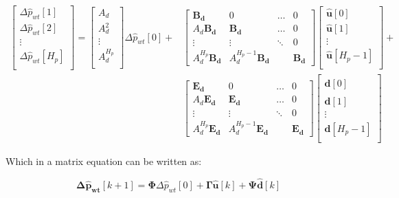 \begin{align}
	\begin{bmatrix}
\Delta \hat p_{wt}[1] \\ 
\Delta \hat p_{wt}[2]\\ 
\vdots \\ 
\Delta \hat p_{wt}[H_p]\\ 
\end{bmatrix}
=
\begin{bmatrix}
A_d \\ 
A_d^2\\ 
\vdots \\ 
A_d^{H_p}\\ 
\end{bmatrix}
\Delta \hat{p}_{wt}[0]+\nonumber
&\begin{bmatrix}
 \bm{B_d}& 0 & \hdots  & 0\\ 
 A_d\bm{B_d}&  \bm{B_d}& \hdots & 0\\ 
\vdots &\vdots  & \ddots  & 0\\ 
 A_d^{H_p}\bm{B_d}& A_d^{H_p-1}\bm{B_d}  &  & \bm{B_d}
\end{bmatrix}
\begin{bmatrix}
 \bm{\hat{u}}[0] \\ 
 \bm{\hat{u}}[1]\\ 
\vdots \\ 
 \bm{\hat{u}}[H_p-1]\\ 
\end{bmatrix}
+ \\
&\begin{bmatrix}
 \bm{E_d}& 0 & \hdots  & 0\\ 
 A_d\bm{E_d}&  \bm{E_d}& \hdots & 0\\ 
\vdots &\vdots  & \ddots  & 0\\ 
 A_d^{H_p}\bm{E_d}& A_d^{H_p-1}\bm{E_d}  &  & \bm{E_d}
\end{bmatrix}
\begin{bmatrix}
 \bm{\hat{d}}[0] \\ 
 \bm{\hat{d}}[1]\\ 
\vdots \\ 
 \bm{\hat{d}}[H_p-1]\\ 
\end{bmatrix} 
\end{align}

Which in a matrix equation can be written as: 

\begin{equation}
	\bm{\Delta \hat p_{wt}} [k+1] = \bm{\Phi} \Delta \hat p_{wt}[0] + \bm{\Gamma \hat{u}}[k] + \bm{\Psi} \bm{\hat{d}}[k]
\end{equation}

